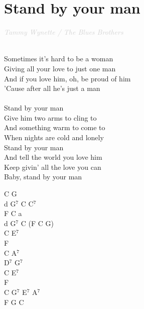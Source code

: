 \documentclass[a5paper, 10pt]{book}
\begin{document}
\section{Stand by your man}\textcolor{lightgray}{\textit{Tammy Wynette / The Blues Brothers}}\\~\\
\begin{minipage}[t]{0.7\textwidth}
Sometimes it's hard to be a woman\\
Giving all your love to just one man\\
And if you love him, oh, be proud of him\\
'Cause after all he's just a man\\
\\
\hspace*{5mm}Stand by your man\\
\hspace*{5mm}Give him two arms to cling to\\
\hspace*{5mm}And something warm to come to\\
\hspace*{5mm}When nights are cold and lonely\\
\hspace*{5mm}Stand by your man\\
\hspace*{5mm}And tell the world you love him\\
\hspace*{5mm}Keep givin' all the love you can\\
\hspace*{5mm}Baby, stand by your man\\
\end{minipage}
\begin{minipage}[t]{0.3\textwidth}
C G\\
d G$^7$ C C$^7$\\
F C a\\
d G$^7$ C (F C G)\\

C E$^7$\\
F\\
C A$^7$\\
D$^7$ G$^7$\\
C E$^7$\\
F\\
C G$^7$ E$^7$ A$^7$\\
F G C\\
\end{minipage}
\end{document}
